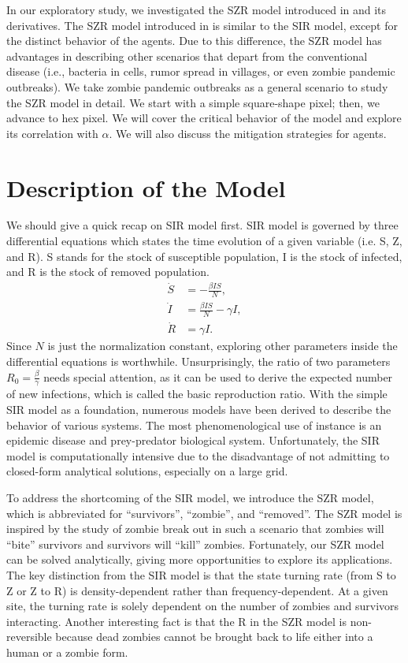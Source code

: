 \documentclass[11pt]{article}
\begin{document}
In our exploratory study, we investigated the SZR model introduced in \cite{Zombies} and its derivatives. The SZR model introduced in \cite{Zombies} is similar to the SIR model, except for the distinct behavior of the agents. Due to this difference, the SZR model has advantages in describing other scenarios that depart from the conventional disease (i.e., bacteria in cells, rumor spread in villages, or even zombie pandemic outbreaks). We take zombie pandemic outbreaks as a general scenario to study the SZR model in detail. We start with a simple square-shape pixel; then, we advance to hex pixel. We will cover the critical behavior of the model and explore its correlation with $\alpha$. We will also discuss the mitigation strategies for agents. 

\section{Description of the Model}
We should give a quick recap on SIR model first. SIR model is governed by three differential equations which states the time evolution of a given variable (i.e. S, Z, and R). S stands for the stock of susceptible population, I is the stock of infected, and R is the stock of removed population.
\begin{align}
    \dot{S} & = -\frac{\beta IS}{N},           \\
    \dot{I} & = \frac{\beta IS}{N} - \gamma I, \\
    \dot{R} & = \gamma I.
\end{align}
Since $N$ is just the normalization constant, exploring other parameters inside the differential equations is worthwhile. Unsurprisingly, the ratio of two parameters $R_0 = \frac{\beta}{\gamma}$ needs special attention, as it can be used to derive the expected number of new infections, which is called the basic reproduction ratio. With the simple SIR model as a foundation, numerous models have been derived to describe the behavior of various systems. The most phenomenological use of instance is an epidemic disease and prey-predator biological system. Unfortunately, the SIR model is computationally intensive due to the disadvantage of not admitting to closed-form analytical solutions, especially on a large grid.

To address the shortcoming of the SIR model, we introduce the SZR model, which is abbreviated for ``survivors'', ``zombie'', and ``removed''. The SZR model is inspired by the study of zombie break out in such a scenario that zombies will ``bite'' survivors and survivors will ``kill'' zombies. Fortunately, our SZR model can be solved analytically, giving more opportunities to explore its applications. The key distinction from the SIR model is that the state turning rate (from S to Z or Z to R) is density-dependent rather than frequency-dependent. At a given site, the turning rate is solely dependent on the number of zombies and survivors interacting. Another interesting fact is that the R in the SZR model is non-reversible because dead zombies cannot be brought back to life either into a human or a zombie form.
\end{document}
